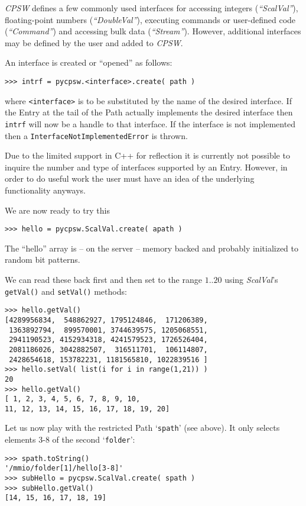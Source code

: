 \documentclass[10pt]{article}
\newcommand{\ita}[1]{\emph{#1}}
\newcommand{\cpsw}      {\ita {CPSW}}
\newcommand{\entry}     {{Entry}}
\newcommand{\Path}      {{Path}}
\newcommand{\cpp}       {C++}
\newcommand{\cod}[1] {{\tt#1}}
\begin{document}
\cpsw{} defines a few commonly used interfaces for accessing integers ({\em ``ScalVal''}),
floating-point numbers ({\em ``DoubleVal''}), executing commands or user-defined code
({\em ``Command''}) and accessing bulk data ({\em ``Stream''}). However, additional
interfaces may be defined by the user and added to \cpsw{}.

An interface is created or ``opened'' as follows:
\begin{verbatim}
>>> intrf = pycpsw.<interface>.create( path )
\end{verbatim}
where \cod{<interface>} is to be substituted by the name of the desired interface.
If the \entry{} at the tail of the \Path{} actually implements the desired interface
then \cod{intrf} will now be a handle to that interface. If the interface is not
implemented then a \cod{InterfaceNotImplementedError} is thrown.

Due to the limited support in \cpp{} for reflection it is currently not possible to 
inquire the number and type of interfaces supported by an \entry{}. However, in
order to do useful work the user must have an idea of the underlying functionality
anyways.

We are now ready to try this
\begin{verbatim}
>>> hello = pycpsw.ScalVal.create( apath )
\end{verbatim}
The ``hello'' array is -- on the server -- memory backed and probably initialized
to random bit patterns.

We can read these back first and then set to the range $1..20$ using {\em ScalVal}'s
\cod{getVal()} and \cod{setVal()} methods:
\begin{verbatim}
>>> hello.getVal()
[4289956834,  548862927, 1795124846,  171206389,
 1363892794,  899570001, 3744639575, 1205068551,
 2941190523, 4152934318, 4241579523, 1726526404,
 2081186026, 3042882507,  316511701,  106114807,
 2428654618, 153782231, 1181565810, 1022839516 ]
>>> hello.setVal( list(i for i in range(1,21)) )
20
>>> hello.getVal()
[ 1, 2, 3, 4, 5, 6, 7, 8, 9, 10,
11, 12, 13, 14, 15, 16, 17, 18, 19, 20]
\end{verbatim}

Let us now play with the restricted \Path{} `\cod{spath}' (see above).
It only selects elements 3-8 of the second `\cod{folder}':
\begin{verbatim}
>>> spath.toString()
'/mmio/folder[1]/hello[3-8]'
>>> subHello = pycpsw.ScalVal.create( spath )
>>> subHello.getVal()
[14, 15, 16, 17, 18, 19]
\end{verbatim}
\end{document}
